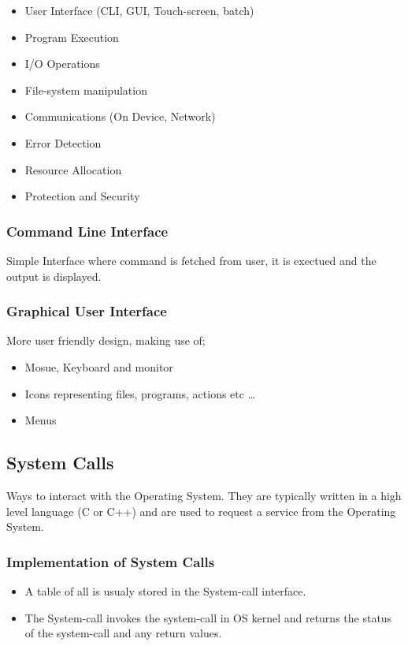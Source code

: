 \documentclass[]{article}
\begin{document}
\begin{itemize}
    \item User Interface (CLI, GUI, Touch-screen, batch)
    \item Program Execution
    \item I/O Operations
    \item File-system manipulation
    \item Communications (On Device, Network)
    \item Error Detection
    \item Resource Allocation
    \item Protection and Security
\end{itemize}

\subsubsection*{Command Line Interface}

Simple Interface where command is fetched from user, it is exectued and the output is displayed.

\subsubsection*{Graphical User Interface}
More user friendly design, making use of;
\begin{itemize}
    \item Mosue, Keyboard and monitor
    \item Icons representing files, programs, actions etc \dots
    \item Menus
\end{itemize}

\subsection{System Calls}

Ways to interact with the Operating System. They are typically written in a high level language (C or C++) and are used to request a service from the Operating System.

\subsubsection*{Implementation of System Calls}

\begin{itemize}
    \item A table of all is usualy stored in the System-call interface.
    \item The System-call invokes the system-call in OS kernel and returns the status of the system-call and any return values.
\end{itemize}
\end{document}
